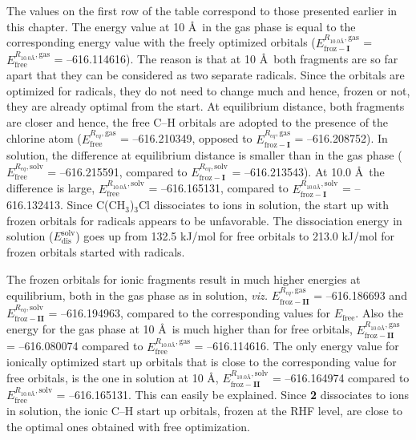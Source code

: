 The values on the first row of the table correspond to those presented earlier in this chapter. The energy value at 10 \AA\ in the gas phase is equal to the corresponding energy value with the freely optimized orbitals ($E_\mathrm{froz-\textbf{I}}^{R_{10.0 \text{\AA}},\mathrm{gas}}$ = $E_\mathrm{free}^{R_{10.0 \text{\AA}},\mathrm{gas}}$ = {--616.114616}). The reason is that at 10 \AA\ both fragments are so far apart that they can be considered as two separate radicals. Since the orbitals are optimized for radicals, they do not need to change much and hence, frozen or not, they are already optimal from the start. At equilibrium distance,  both fragments are closer and hence, the free C--H orbitals are adopted to the presence of the chlorine atom ($E_\mathrm{free}^{R_{eq},\mathrm{gas}}$ = {--616.210349}, opposed to $E_\mathrm{froz-\textbf{I}}^{R_{eq},\mathrm{gas}}$ = {--616.208752}). In solution, the difference at equilibrium distance is smaller than in the gas phase ($E_\mathrm{free}^{R_{eq},\mathrm{solv}}$ = {--616.215591}, compared to $E_\mathrm{froz-\textbf{I}}^{R_{eq},\mathrm{solv}}$ = {--616.213543}). At 10.0 \AA\ the difference is large, $E_\mathrm{free}^{R_{10.0 \text{\AA}},\mathrm{solv}}$ = {--616.165131}, compared to $E_\mathrm{froz-\textbf{I}}^{R_{10.0 \text{\AA}},\mathrm{solv}}$ = {--616.132413}. Since C(CH$_3$)$_3$Cl dissociates to ions in solution, the start up with frozen orbitals for radicals appears to be unfavorable. The dissociation energy in solution ($E_\mathrm{dis}^\mathrm{solv}$) goes up from 132.5 kJ/mol for free orbitals to 213.0 kJ/mol for frozen orbitals started with radicals.

The frozen orbitals for ionic fragments result in much higher energies at equilibrium, both in the gas phase as in solution, \textit{viz.} $E_\mathrm{froz-\textbf{II}}^{R_{eq},\mathrm{gas}}$ = {--616.186693} and $E_\mathrm{froz-\textbf{II}}^{R_{eq},\mathrm{solv}}$ = {--616.194963}, compared to the corresponding values for $E_\mathrm{free}$. Also the energy for the gas phase at 10 \AA\ is much higher than for free orbitals, $E_\mathrm{froz-\textbf{II}}^{R_{10.0 \text{\AA}},\mathrm{gas}}$ = {--616.080074} compared to $E_\mathrm{free}^{R_{10.0 \text{\AA}},\mathrm{gas}}$ = {--616.114616}. The only energy value for ionically optimized start up orbitals that is close to the corresponding value for free orbitals, is the one in solution at 10 \AA, $E_\mathrm{froz-\textbf{II}}^{R_{10.0 \text{\AA}},\mathrm{solv}}$ = {--616.164974} compared to $E_\mathrm{free}^{R_{10.0 \text{\AA}},\mathrm{solv}}$ = {--616.165131}. This can easily be explained. Since \textbf{2} dissociates to ions in solution, the ionic C--H start up orbitals, frozen at the RHF level, are close to the optimal ones obtained with free optimization.


